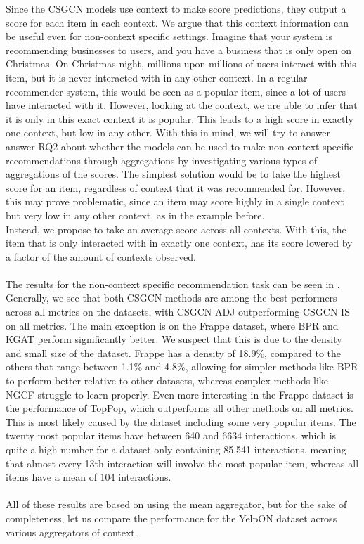 Since the CSGCN models use context to make score predictions, they output a score for each item in each context.
We argue that this context information can be useful even for non-context specific settings.
Imagine that your system is recommending businesses to users, and you have a business that is only open on Christmas.
On Christmas night, millions upon millions of users interact with this item, but it is never interacted with in any other context.
In a regular recommender system, this would be seen as a popular item, since a lot of users have interacted with it.
However, looking at the context, we are able to infer that it is only in this exact context it is popular.
This leads to a high score in exactly one context, but low in any other.
With this in mind, we will try to answer answer RQ2 about whether the models can be used to make non-context specific recommendations through aggregations by investigating various types of aggregations of the scores.
The simplest solution would be to take the highest score for an item, regardless of context that it was recommended for.
However, this may prove problematic, since an item may score highly in a single context but very low in any other context, as in the example before.\\
Instead, we propose to take an average score across all contexts.
With this, the item that is only interacted with in exactly one context, has its score lowered by a factor of the amount of contexts observed.
\\\\
The results for the non-context specific recommendation task can be seen in .
Generally, we see that both CSGCN methods are among the best performers across all metrics on the datasets, with CSGCN-ADJ outperforming CSGCN-IS on all metrics.
The main exception is on the Frappe dataset, where BPR and KGAT perform significantly better.
We suspect that this is due to the density and small size of the dataset.
Frappe has a density of 18.9\%, compared to the others that range between 1.1\% and 4.8\%, allowing for simpler methods like BPR to perform better relative to other datasets, whereas complex methods like NGCF struggle to learn properly.
Even more interesting in the Frappe dataset is the performance of TopPop, which outperforms all other methods on all metrics.
This is most likely caused by the dataset including some very popular items.
The twenty most popular items have between 640 and 6634 interactions, which is quite a high number for a dataset only containing 85,541 interactions, meaning that almost every 13th interaction will involve the most popular item, whereas all items have a mean of 104 interactions.\\\\
All of these results are based on using the mean aggregator, but for the sake of completeness, let us compare the performance for the YelpON dataset across various aggregators of context.

